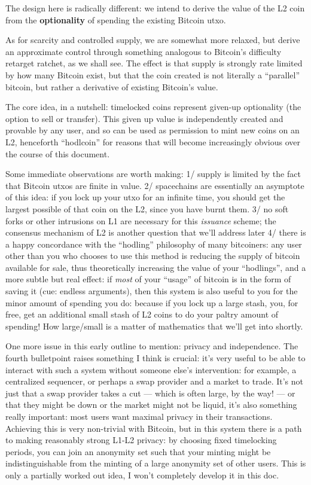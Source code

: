 \documentclass[11pt,a4paper]{article}
\begin{document}
The design here is radically different: we intend to derive the value of the L2 coin from the \textbf{optionality} of spending the existing Bitcoin utxo.

As for scarcity and controlled supply, we are somewhat more relaxed, but derive an approximate control through something analogous to Bitcoin's difficulty retarget ratchet, as we shall see. The effect is that supply is strongly rate limited by how many Bitcoin exist, but that the coin created is not literally a ``parallel'' bitcoin, but rather a derivative of existing Bitcoin's value.

The core idea, in a nutshell: timelocked coins represent given-up optionality (the option to sell or transfer). This given up value is independently created and provable by any user, and so can be used as permission to mint new coins on an L2, henceforth ``hodlcoin'' for reasons that will become increasingly obvious over the course of this document.

Some immediate observations are worth making: 1/ supply is limited by the fact that Bitcoin utxos are finite in value. 2/ spacechains are essentially an asymptote of this idea: if you lock up your utxo for an infinite time, you should get the largest possible of that coin on the L2, since you have burnt them. 3/ no soft forks or other intrusions on L1 are necessary for this \emph{issuance} scheme; the consensus mechanism of L2 is another question that we'll address later 4/ there is a happy concordance with the ``hodling'' philosophy of many bitcoiners: any user other than you who chooses to use this method is reducing the supply of bitcoin available for sale, thus theoretically increasing the value of your ``hodlings'', and a more subtle but real effect: if \emph{most} of your ``usage'' of bitcoin is in the form of saving it (cue: endless arguments), then this system is also useful to you for the minor amount of spending you do: because if you lock up a large stash, you, for free, get an additional small stash of L2 coins to do your paltry amount of spending! How large/small is a matter of mathematics that we'll get into shortly.

One more issue in this early outline to mention: privacy and independence. The fourth bulletpoint raises something I think is crucial: it's very useful to be able to interact with such a system without someone else's intervention: for example, a centralized sequencer, or perhaps a swap provider and a market to trade. It's not just that a swap provider takes a cut --- which is often large, by the way! --- or that they might be down or the market might not be liquid, it's also something really important: most users want maximal privacy in their transactions. Achieving this is very non-trivial with Bitcoin, but in this system there is a path to making reasonably strong L1-L2 privacy: by choosing fixed timelocking periods, you can join an anonymity set such that your minting might be indistinguishable from the minting of a large anonymity set of other users. This is only a partially worked out idea, I won't completely develop it in this doc.
\end{document}
